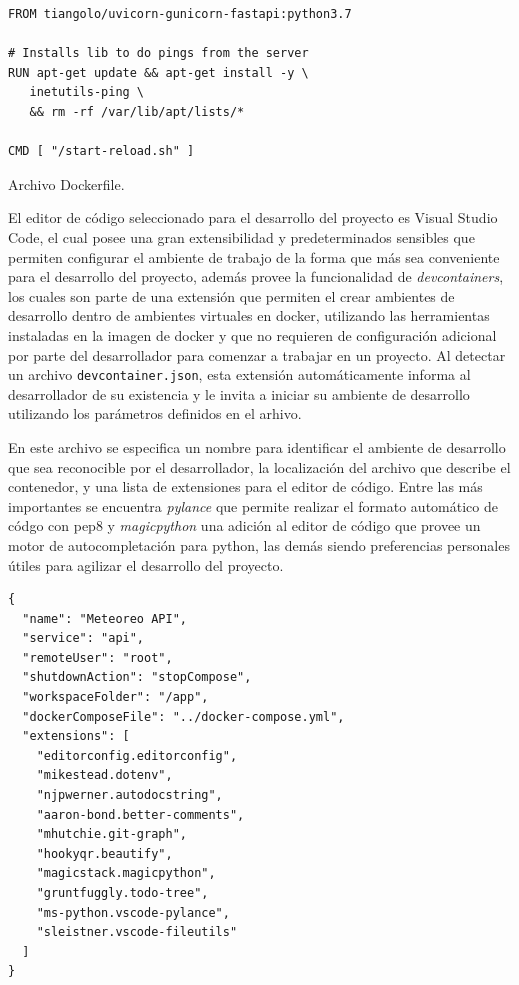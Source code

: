 \begin{listing}[h]
\begin{verbatim}
FROM tiangolo/uvicorn-gunicorn-fastapi:python3.7

# Installs lib to do pings from the server
RUN apt-get update && apt-get install -y \
   inetutils-ping \
   && rm -rf /var/lib/apt/lists/*

CMD [ "/start-reload.sh" ]
\end{verbatim}
\caption[Dockerfile]{Archivo Dockerfile.}
\label{lst:dockerfile}
\end{listing}

El editor de código seleccionado para el desarrollo del proyecto es Visual Studio Code, el cual posee una gran extensibilidad y predeterminados sensibles que permiten configurar el ambiente de trabajo de la forma que más sea conveniente para el desarrollo del proyecto, además provee la funcionalidad de \textit{devcontainers}, los cuales son parte de una extensión que permiten el crear ambientes de desarrollo dentro de ambientes virtuales en docker, utilizando las herramientas instaladas en la imagen de docker y que no requieren de configuración adicional por parte del desarrollador para comenzar a trabajar en un proyecto. Al detectar un archivo \texttt{devcontainer.json}, esta extensión automáticamente informa al desarrollador de su existencia y le invita a iniciar su ambiente de desarrollo utilizando los parámetros definidos en el arhivo.

En este archivo se especifica un nombre para identificar el ambiente de desarrollo que sea reconocible por el desarrollador, la localización del archivo que describe el contenedor, y una lista de extensiones para el editor de código. Entre las más importantes se encuentra \emph{pylance} que permite  realizar el formato automático de códgo con pep8 y \emph{magicpython} una adición al editor de código que provee un motor de autocompletación para python, las demás siendo preferencias personales útiles para agilizar el desarrollo del proyecto.


\begin{verbatim}
{
  "name": "Meteoreo API",
  "service": "api",
  "remoteUser": "root",
  "shutdownAction": "stopCompose",
  "workspaceFolder": "/app",
  "dockerComposeFile": "../docker-compose.yml",
  "extensions": [
    "editorconfig.editorconfig",
    "mikestead.dotenv",
    "njpwerner.autodocstring",
    "aaron-bond.better-comments",
    "mhutchie.git-graph",
    "hookyqr.beautify",
    "magicstack.magicpython",
    "gruntfuggly.todo-tree",
    "ms-python.vscode-pylance",
    "sleistner.vscode-fileutils"
  ]
}
\end{verbatim}

